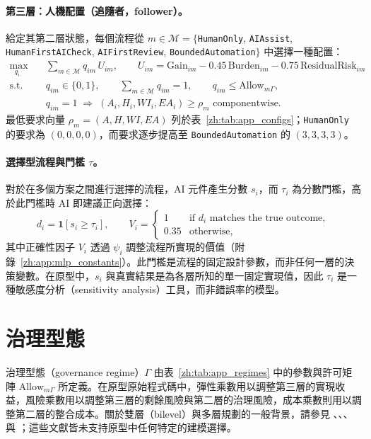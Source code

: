 \paragraph{第三層：人機配置（追隨者，follower）。}給定其第二層狀態，每個流程從 $m\in\mathcal{M}=\{$\texttt{HumanOnly}, \texttt{AIAssist}, \texttt{HumanFirstAICheck}, \texttt{AIFirstReview}, \texttt{BoundedAutomation}$\}$ 中選擇一種配置：
\begin{align}
\max_{q_{i\cdot}}\quad & \sum_{m\in\mathcal{M}} q_{im}\,U_{im}, \qquad U_{im} = \mathrm{Gain}_{im} - 0.45\,\mathrm{Burden}_{im} - 0.75\,\mathrm{ResidualRisk}_{im} \label{zh:eq:mlp_l3}\\
\text{s.t.}\quad & q_{im}\in\{0,1\},\qquad \sum_{m\in\mathcal{M}} q_{im}=1,\qquad q_{im}\leq\mathrm{Allow}_{m\Gamma}, \nonumber\\
& q_{im}=1 \;\Rightarrow\; (A_i,H_i,WI_i,EA_i)\geq\rho_m \text{ componentwise}. \nonumber
\end{align}
最低要求向量 $\rho_m=(A,H,WI,EA)$ 列於表~\ref{zh:tab:app_configs}；\texttt{HumanOnly} 的要求為 $(0,0,0,0)$，而要求逐步提高至 \texttt{BoundedAutomation} 的 $(3,3,3,3)$。

\paragraph{選擇型流程與門檻 $\tau$。}對於在多個方案之間進行選擇的流程，AI 元件產生分數 $s_i$，而 $\tau_i$ 為分數門檻，高於此門檻時 AI 即建議正向選擇：
\begin{equation}
d_i=\mathbf{1}\!\left[s_i\geq\tau_i\right], \qquad V_i=\begin{cases}1 & \text{if } d_i \text{ matches the true outcome},\\ 0.35 & \text{otherwise},\end{cases}
\label{zh:eq:mlp_tau}
\end{equation}
其中正確性因子 $V_i$ 透過 $\psi_i$ 調整流程所實現的價值（附錄~\ref{zh:app:mlp_constants}）。此門檻是流程的固定設計參數，而非任何一層的決策變數。在原型中，$s_i$ 與真實結果是為各層所知的單一固定實現值，因此 $\tau_i$ 是一種敏感度分析（sensitivity analysis）工具，而非錯誤率的模型。

\section{治理型態}

治理型態（governance regime）$\Gamma$ 由表~\ref{zh:tab:app_regimes} 中的參數與許可矩陣 $\mathrm{Allow}_{m\Gamma}$ 所定義。在原型原始程式碼中，彈性乘數用以調整第三層的實現收益，風險乘數用以調整第三層的剩餘風險與第二層的治理風險，成本乘數則用以調整第二層的整合成本。關於雙層（bilevel）與多層規劃的一般背景，請參見 \citet{dempe2002foundations}、\citet{colson2007overview}、\citet{fortunyamat1981representation}、\citet{lee2001fuzzy} 與 \citet{cheng2019fuzzy}；這些文獻皆未支持原型中任何特定的建模選擇。

